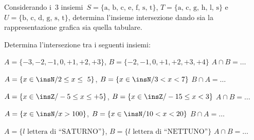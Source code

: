 % 
% 
% 

\begin{esercizio}
 \label{ese:7.12}
Considerando i~3 insiemi~\(S=\{\text{a, b, c, e, f, s, t}\}\), \(T=\{\text{a, c, g, 
h, l, s}\}\) e~\(U=\{\text{b, c, d, g, s, t}\}\),
determina l'insieme intersezione dando sia la rappresentazione grafica sia 
quella tabulare.
 \end{esercizio}

\begin{esercizio}
 \label{ese:7.13}
 Determina l'intersezione tra i seguenti insiemi:
\begin{enumeratea}
 \item \(A=\{-3, -2, -1, 0, +1, +2, +3\}\), \(B=\{-2,-1, 0, +1, +2, +3, +4\}\) 
\(A\cap B=\ldots\)
 \item \(A=\{x\in\insN/2\le x\le~5\}\), \(B=\{x\in\insN/3<x<7\}\) \(B\cap A=\ldots\)
 \item \(A=\{x\in\insZ/-5\le x\le+5\}\), \(B=\{x\in\insZ/-15\le x<3\}\) \(A\cap 
B=\ldots\)
 \item \(A=\{x\in\insN/x>100\}\), \(B=\{x\in\insN/10<x<20\}\) \(B\cap A=\ldots\)
 \item \(A=\{l\text{ lettera di ``SATURNO''}\}\), \(B=\{l\text{ lettera di 
``NETTUNO''}\}\) \(A\cap B=\ldots\)
\end{enumeratea}
\end{esercizio}

